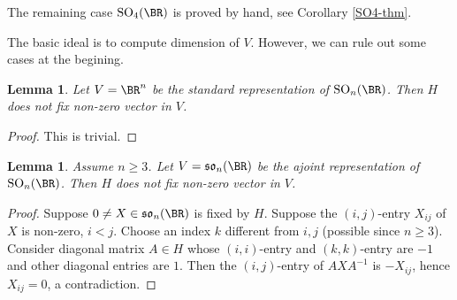 \documentclass[a4paper]{amsart}
\newcommand{\SO}{{\mathrm{SO}}}\newcommand{\so}{\mathfrak{so}}
\theoremstyle{plain}
\newtheorem{lem}[thm]{Lemma}
\theoremstyle{remark} \newtheorem{remark}[thm]{Remark}
\theoremstyle{remark} \newtheorem{exercise}{Exercise}
\theoremstyle{remark} \newtheorem{example}{Example}
\numberwithin{equation}{section}
\begin{document}
The remaining case $\SO_4(\BR)$ is proved by hand, see Corollary \ref{SO4-thm}.

The basic ideal is to compute dimension of $V$. However, we can rule out some cases at the begining.

\begin{lem}\label{natural representation-no-fix}
    Let $V=\BR^n$ be the standard representation of $\SO_n(\BR)$. Then $H$ does not fix non-zero vector in $V$.
\end{lem}
\begin{proof}
    This is trivial.
\end{proof}

\begin{lem}\label{adj-no-fix}
    Assume $n\geqslant 3$. Let $V=\mathfrak{so}_n(\BR)$ be the ajoint representation of $\SO_n(\BR)$. Then $H$ does not fix non-zero vector in $V$.
\end{lem}
\begin{proof}
    Suppose $0\neq X\in \mathfrak{so}_n(\BR)$ is fixed by $H$. Suppose the $(i,j)$-entry $X_{ij}$ of $X$ is non-zero, $i<j$. Choose an index $k$ different from $i,j$ (possible since $n\geqslant 3$). Consider diagonal matrix $A\in H$ whose $(i,i)$-entry and $(k,k)$-entry are $-1$ and other diagonal entries are $1$. Then the $(i,j)$-entry of $AXA^{-1}$ is $-X_{ij}$, hence $X_{ij}=0$, a contradiction.
\end{proof}





\end{document}
